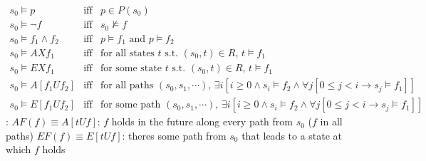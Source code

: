 \documentclass{note}
\begin{document}
  \begin{eqnarray*}
  s_0 \models p & \mbox{iff}& p \in P(s_0)\\
  s_0 \models \neg f & \mbox{iff}&  s_0 \not\models f \\
  s_0 \models f_1 \wedge f_2 & \mbox{iff} & p \models f_1 \mbox{\ and\ } p
  \models f_2\\
  s_0 \models AXf_1 & \mbox{iff} & \mbox{for all states $t$ s.t. $(s_0, t) \in
  R$,\ } t \models f_1\\
  s_0 \models EXf_1 & \mbox{iff} & \mbox{for some state $t$ s.t. $(s_0, t) \in
  R$,\ } t \models f_1\\
  s_0 \models A[f_1 U f_2] & \mbox{iff} & \mbox{for all paths $(s_0, s_1,
    \cdots)$,\ \ } \exists{i}[i \ge 0 \wedge s_i \models f_2 \wedge
      \forall{j}[0 \le j < i \rightarrow s_j \models f_1]]\\
  s_0 \models E[f_1 U f_2] & \mbox{iff} & \mbox{for some path $(s_0, s_1,
    \cdots)$,\ \ } \exists{i}[i \ge 0 \wedge s_i \models f_2 \wedge
      \forall{j}[0 \le j < i \rightarrow s_j \models f_1]]
  \end{eqnarray*}
 \w {}:
  \bit
  \w $AF(f) \equiv A[t U f]$: $f$ holds in the future along every path from
  $s_0$ ($f$  in all paths)
  \w $EF(f) \equiv E[t U f]$: theres some path from $s_0$ that leads to a
  state at which $f$ holds
    
  \eit
 \eit



\end{document}
